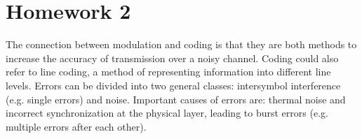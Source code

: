 \documentclass[11pt,titlepage]{report}
\begin{document}
\chapter{Homework 2}
The connection between modulation and coding is that they are both methods to increase the accuracy of transmission over a noisy channel.
Coding could also refer to line coding, a method of representing information into different line levels. 
Errors can be divided into two general classes: intersymbol interference (e.g. single errors) and noise. Important causes of errors are: thermal noise and incorrect synchronization at the physical layer, leading to burst errors (e.g. multiple errors after each other).
\end{document}

